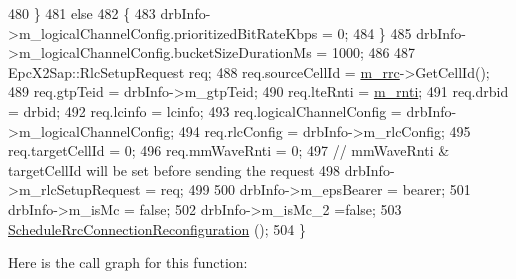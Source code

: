 \begin{DoxyCode}
480     \}
481   \textcolor{keywordflow}{else}
482     \{
483       drbInfo->m\_logicalChannelConfig.prioritizedBitRateKbps = 0;
484     \}
485   drbInfo->m\_logicalChannelConfig.bucketSizeDurationMs = 1000;
486 
487   EpcX2Sap::RlcSetupRequest req;
488   req.sourceCellId = \hyperlink{classns3_1_1UeManager_ab4405e9f354c66e7c1a4c95832290f5b}{m\_rrc}->GetCellId();
489   req.gtpTeid = drbInfo->m\_gtpTeid;
490   req.lteRnti = \hyperlink{classns3_1_1UeManager_a5a72b4fe818f21993bd7f05d7e2c4f83}{m\_rnti};
491   req.drbid = drbid;
492   req.lcinfo = lcinfo;
493   req.logicalChannelConfig = drbInfo->m\_logicalChannelConfig;
494   req.rlcConfig = drbInfo->m\_rlcConfig;
495   req.targetCellId = 0;
496   req.mmWaveRnti = 0;
497   \textcolor{comment}{// mmWaveRnti & targetCellId will be set before sending the request}
498   drbInfo->m\_rlcSetupRequest = req;
499 
500   drbInfo->m\_epsBearer = bearer;
501   drbInfo->m\_isMc = \textcolor{keyword}{false};
502   drbInfo->m\_isMc\_2 =\textcolor{keyword}{false};
503   \hyperlink{classns3_1_1UeManager_add763d882c14c2f1414167668f6ca095}{ScheduleRrcConnectionReconfiguration} ();
504 \}
\end{DoxyCode}


Here is the call graph for this function\+:


